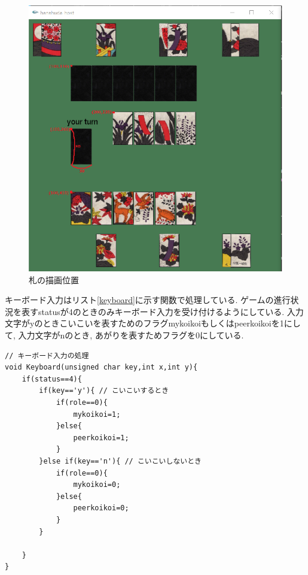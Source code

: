 \documentclass[a4j]{jarticle}
\begin{document}
    \begin{figure}[H]
    \centering
    \includegraphics[scale=1.5]{./img/xy.eps}
    \caption{札の描画位置}
    \label{xy}
    \end{figure}

    キーボード入力はリスト\ref{keyboard}に示す関数で処理している. ゲームの進行状況を表すstatusが4のときのみキーボード入力を受け付けるようにしている.
    入力文字がyのときこいこいを表すためのフラグmykoikoiもしくはpeerkoikoiを1にして, 入力文字がnのとき, あがりを表すためフラグを0にしている.
    \begin{lstlisting}[basicstyle=\ttfamily\footnotesize, frame=single,label=keyboard,caption=キーボード入力の処理]
// キーボード入力の処理
void Keyboard(unsigned char key,int x,int y){
    if(status==4){
        if(key=='y'){ // こいこいするとき
            if(role==0){
                mykoikoi=1;
            }else{
                peerkoikoi=1;
            }
        }else if(key=='n'){ // こいこいしないとき
            if(role==0){
                mykoikoi=0;
            }else{
                peerkoikoi=0;
            }
        }

    }
}
    \end{lstlisting}
\end{document}
